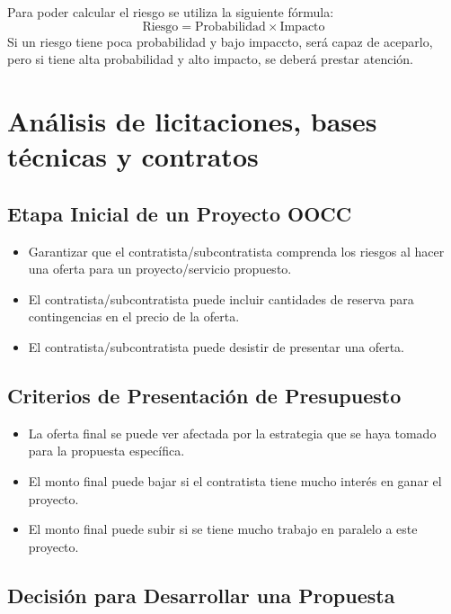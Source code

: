 Para poder calcular el riesgo se utiliza la siguiente fórmula:
\begin{equation}
    \text{Riesgo} = \text{Probabilidad} \times \text{Impacto}
\end{equation}
Si un riesgo tiene poca probabilidad y bajo impaccto, será capaz de aceparlo, pero si tiene alta probabilidad y alto impacto, se deberá prestar atención.

\section{Análisis de licitaciones, bases técnicas y contratos}

\subsection*{Etapa Inicial de un Proyecto OOCC}

\begin{itemize}
    \item Garantizar que el contratista/subcontratista comprenda los riesgos al hacer una oferta para un proyecto/servicio propuesto.
    \item El contratista/subcontratista puede incluir cantidades de reserva para contingencias en el precio de la oferta.
    \item El contratista/subcontratista puede desistir de presentar una oferta.
\end{itemize}

\subsection*{Criterios de Presentación de Presupuesto}

\begin{itemize}
    \item La oferta final se puede ver afectada por la estrategia que se haya tomado para la propuesta específica.
    \item El monto final puede bajar si el contratista tiene mucho interés en ganar el proyecto.
    \item El monto final puede subir si se tiene mucho trabajo en paralelo a este proyecto.
\end{itemize}

\subsection*{Decisión para Desarrollar una Propuesta}


